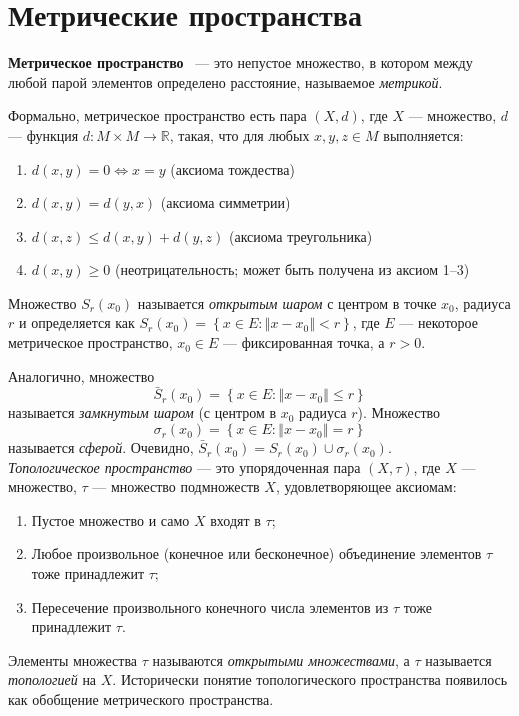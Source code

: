\section{Метрические пространства}\label{sec:q-1}
\textbf{Метрическое пространство} ~--- это непустое множество, в котором между любой парой элементов определено расстояние, называемое \textit{метрикой}\cite[с.~18]{trenogin}.

Формально, метрическое пространство есть пара $(X, d)$, где $X$ --- множество, $d$ --- функция $d \colon M \times M \to \mathbb{R}$, такая, что для любых $x,y,z\in M$ выполняется:
\begin{enumerate}
	\itemsep0em
	\item ${\displaystyle d(x,y)=0\Leftrightarrow x=y}$ (аксиома тождества)
	\item ${\displaystyle d(x,y)=d(y,x)}$ (аксиома симметрии)
	\item ${\displaystyle d(x,z)\leqslant d(x,y)+d(y,z)}$ (аксиома треугольника)
	\item $d(x,y)\geqslant 0$ (неотрицательность; может быть получена из аксиом 1--3)
\end{enumerate}

Множество $S_r(x_0)$ называется \textit{открытым шаром} с центром в точке $x_0$, радиуса $r$ и определяется как $S_r(x_0)=\left\{x \in E\colon \left\Vert x - x_0 \right\Vert < r\right\}$, где $E$ --- некоторое метрическое пространство, $x_0 \in E$ --- фиксированная точка, а $r > 0$.

Аналогично, множество
$$\bar{S}_r(x_0)=\left\{x \in E\colon \left\Vert x - x_0 \right\Vert \leqslant r\right\}$$
называется \textit{замкнутым шаром} (с центром в $x_0$ радиуса $r$). Множество
$$\sigma_r(x_0)=\left\{x \in E\colon \left\Vert x - x_0 \right\Vert = r\right\}$$
называется \textit{сферой}. Очевидно, $\bar{S}_r(x_0)=S_r(x_0) \cup \sigma_r(x_0)$.\\

\textit{Топологическое пространство} --- это упорядоченная пара $(X, \tau)$, где $X$ --- множество, $\tau$ --- множество подмножеств $X$, удовлетворяющее аксиомам:
\begin{enumerate}
	\itemsep0em
	\item Пустое множество и само $X$ входят в $\tau$;
	\item Любое произвольное (конечное или бесконечное) объединение элементов $\tau$ тоже принадлежит $\tau$;
	\item Пересечение произвольного конечного числа элементов из $\tau$ тоже принадлежит $\tau$.
\end{enumerate}
Элементы множества $\tau$ называются \textit{открытыми множествами}, а $\tau$ называется \textit{топологией} на $X$. Исторически понятие топологического пространства появилось как обобщение метрического пространства.